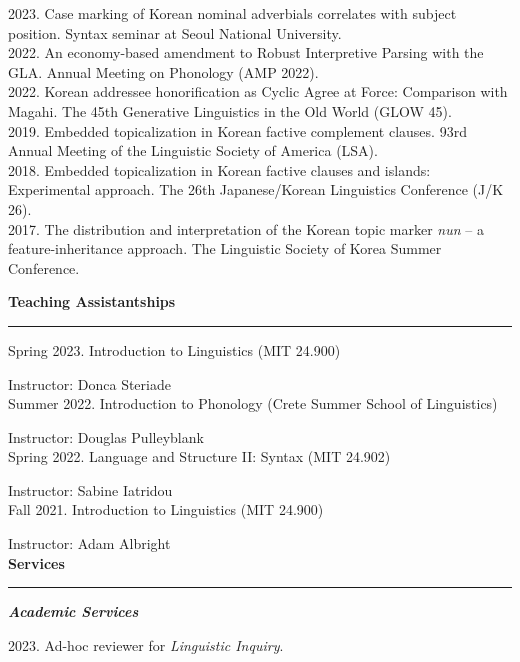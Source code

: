 \documentclass[11pt]{article}
\newcommand{\sect}[1]{{\fontsize{15}{25}\selectfont \textbf{#1}} {\vspace{0.1cm}} \hrule {\vspace{0.3cm}}}
\newcommand{\subsect}[1]{{\fontsize{12}{18}\selectfont \textit{\textbf{#1}}} {\vspace{0.3cm}}}
\begin{document}
{2023. Case marking of Korean nominal adverbials correlates with subject position. Syntax seminar at Seoul National University. }\\

{2022. An economy-based amendment to Robust Interpretive Parsing with the GLA. Annual Meeting on Phonology (AMP 2022).}\\

{2022. Korean addressee honorification as Cyclic Agree at Force: Comparison with Magahi. The 45th Generative Linguistics in the Old World (GLOW 45).}\\

{2019. Embedded topicalization in Korean factive complement clauses. 93rd Annual Meeting of the Linguistic Society of America (LSA).}\\

{2018. Embedded topicalization in Korean factive clauses and islands: Experimental approach. The 26th Japanese/Korean Linguistics Conference (J/K 26).}\\

{2017. The distribution and interpretation of the Korean topic marker \textit{nun} -- a feature-inheritance approach. The Linguistic Society of Korea Summer Conference.}

{\vspace{1cm}}

\sect{Teaching Assistantships}

Spring 2023. Introduction to Linguistics (MIT 24.900)

{\hphantom{Spring 2023.}} Instructor: Donca Steriade\\

Summer 2022. Introduction to Phonology (Crete Summer School of Linguistics)

{\hphantom{Summer 2022.}} Instructor: Douglas Pulleyblank\\

Spring 2022. Language and Structure II: Syntax (MIT 24.902)

{\hphantom{Spring 2022.}} Instructor: Sabine Iatridou\\

Fall 2021. Introduction to Linguistics (MIT 24.900)

{\hphantom{Fall 2021.}} Instructor: Adam Albright\\

\sect{Services}

\subsect{Academic Services}

2023. Ad-hoc reviewer for {\textit{Linguistic Inquiry}}.\\
\end{document}
